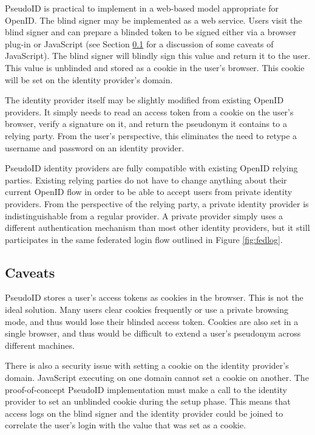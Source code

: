 \documentclass{llncs}
\begin{document}
PseudoID is practical to implement in a web-based model appropriate for OpenID. The blind signer may be implemented as a web service. Users visit the blind signer and can prepare a blinded token to be signed either via a browser plug-in or JavaScript (see Section \ref{subsec:caveats} for a discussion of some caveats of JavaScript). The blind signer will blindly sign this value and return it to the user. This value is unblinded and stored as a cookie in the user's browser. This cookie will be set on the identity provider's domain.

The identity provider itself may be slightly modified from existing OpenID providers. It simply needs to read an access token from a cookie on the user's browser, verify a signature on it, and return the pseudonym it contains to a relying party. From the user's perspective, this eliminates the need to retype a username and password on an identity provider.

PseudoID identity providers are fully compatible with existing OpenID relying parties. Existing relying parties do not have to change anything about their current OpenID flow in order to be able to accept users from private identity providers. From the perspective of the relying party, a private identity provider is indistinguishable from a regular provider. A private provider simply uses a different authentication mechanism than most other identity providers, but it still participates in the same federated login flow outlined in Figure \ref{fig:fedlog}.

\subsection{Caveats}
\label{subsec:caveats}



PseudoID stores a user's access tokens as cookies in the browser. This is not the ideal solution. Many users clear cookies frequently or use a private browsing mode, and thus would lose their blinded access token. Cookies are also set in a single browser, and thus would be difficult to extend a user's pseudonym across different machines.

There is also a security issue with setting a cookie on the identity provider's domain. JavaScript executing on one domain cannot set a cookie on another. The proof-of-concept PseudoID implementation must make a call to the identity provider to set an unblinded cookie during the setup phase. This means that access logs on the blind signer and the identity provider could be joined to correlate the user's login with the value that was set as a cookie.
\end{document}
